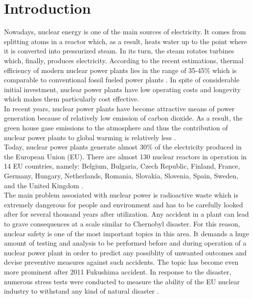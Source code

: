 \chapter{Introduction}\label{chapter:introduction}

Nowadays, nuclear energy is one of the main sources of electricity. It comes from splitting atoms in a reactor which, as a result, heats water up to the point where it is converted into pressurized steam. In its turn, the steam rotates turbines which, finally, produces electricity. According to the recent estimations, thermal efficiency of modern nuclear power plants lies in the range of 35-45\% which is comparable to conventional fossil fueled power plants \cite{intro:efficiency-of-nuclear-power-plants}. In spite of considerable initial investment,  nuclear power plants have low operating costs and longevity which makes them particularly cost effective.\\


In recent years, nuclear power plants have become attractive means of power generation because of relatively low emission of carbon dioxide. As a result, the green house gase emissions to the atmosphere and thus the contribution of nuclear power plants to global warming is relatively less \cite{intro:pros-and-cons-of-nuclear-power}.\\


Today, nuclear power plants generate almost 30\% of the electricity produced in the European Union (EU). There are almost 130 nuclear reactors in operation in 14 EU countries, namely: Belgium, Bulgaria, Czech Republic, Finland, France, Germany, Hungary, Netherlands, Romania, Slovakia, Slovenia, Spain, Sweden, and the United Kingdom \cite{intro:eu-nuclear-industry-general}.\\


The main problem assosiated with nuclear power is radioactive waste which is extremely dangerous for people and environment and has to be carefully looked after for several thousand years after utilization. Any accident in a plant can lead to grave consequences at a scale similar to Chernobyl disaster. For this reason, nuclear safety is one of the most important topics in this area. It demands a huge amount of testing and analysis to be performed before and during operation of a nuclear power plant in order to predict any possiblity of unwanted outcomes and devise preventive measures against such accidents. The topic has become even more prominent after 2011 Fukushima accident. In response to the disaster, numerous stress tests were conducted to measure the ability of the EU nuclear industry to withstand any kind of natural disaster \cite{intro:eu-nuclear-industry-general}.\\



